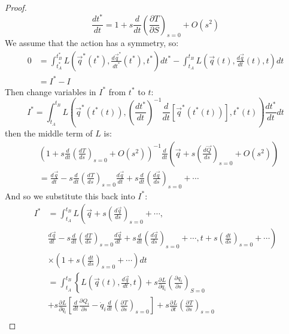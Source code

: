 \documentclass[../Main.tex]{subfiles}
\begin{document}
\begin{proof}
    \begin{equation*}
        \frac{d t^*}{dt} = 1 + s \frac{d}{dt}\left(\frac{\partial T}{\partial S}\right)_{s = 0} + O(s^2)
    \end{equation*}
    We assume that the action has a symmetry, so:
    \begin{align*}
        0 &= \int_{t_A^*}^{t_B^*} L(\vec{q}^*(t^*), \frac{d \vec{q}^*}{dt^*} (t^*), t^*) dt^* - \int_{t_A}^{t_B} L(\vec{q}(t), \frac{d \vec{q}}{dt} (t), t) dt \\
        &= I^* - I
    \end{align*}
    Then change variables in $I^*$ from $t^*$ to $t$:
    \begin{equation*}
        I^* = \int_{t_A}^{t_B} L\left(\vec{q}^*(t^*(t)), \left(\frac{dt^*}{dt}\right)^{-1} \frac{d}{dt} \left[\vec{q}^*(t^*(t))\right], t^*(t)\right) \frac{dt^*}{dt} dt
    \end{equation*}
    then the middle term of $L$ is:
    \begin{align*}
        & \left(1 + s \frac{d}{dt} \left(\frac{d^{}T}{ds^{}}\right)_{s = 0} + O(s^2)\right)^{-1} \frac{d}{dt} \left(\vec{q} + s\left(\frac{d^{}\vec{Q}}{ds^{}}\right)_{s = 0} + O(s^2)\right) \\
        &= \frac{d^{}\vec{q}}{dt^{}} - s\frac{d}{dt} \left(\frac{d^{}T}{ds^{}}\right)_{s = 0} \frac{d\vec{q}}{dt} + s \frac{d}{dt}\left(\frac{d\vec{q}}{ds}\right)_{s = 0} + \cdots
    \end{align*}
    And so we substitute this back into $I^*$:
    \begin{align*}
        I^*&= \int_{t_A}^{t_B} L \left(\vec{q} + s\left(\frac{d\vec{q}}{ds}\right)_{s = 0} + \cdots, \right.\\
        & \left. \frac{d^{}\vec{q}}{dt^{}} - s\frac{d}{dt} \left(\frac{d^{}T}{ds^{}}\right)_{s = 0} \frac{d\vec{q}}{dt} + s \frac{d}{dt}\left(\frac{d\vec{q}}{ds}\right)_{s = 0} + \cdots, t + s \left(\frac{dt}{ds}\right)_{s = 0} + \cdots\right) \\
        &\times \left(1 + s \left(\frac{dt}{ds}\right)_{s = 0} + \cdots\right) dt \\
        &= \int_{t_A}^{t_B} \left\{L\left(\vec{q}(t), \frac{d\vec{q}}{dt}, t\right) + s \frac{\partial^{}L}{\partial q_i^{}} \left(\frac{\partial^{}q_i}{\partial s^{}}\right)_{S = 0} \right.\\
        &+ s \frac{\partial^{}L}{\partial \dot{q}_i^{}} \left[\frac{d}{dt} \frac{\partial^{}Q_i}{\partial s^{}} - \dot{q}_i \frac{d}{dt} \left(\frac{\partial^{}T}{\partial s^{}}\right)_{s = 0}\right] + s \frac{\partial^{}L}{\partial t^{}} \left(\frac{\partial^{}T}{\partial s^{}}\right)_{s = 0} \\

\end{align*}
\end{proof}
\end{document}
